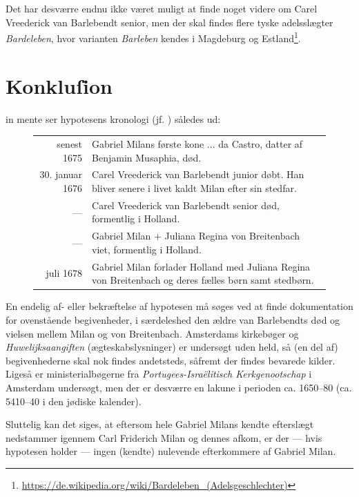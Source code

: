 \documentclass[
	a4paper,
	12pt,
	final
]{memoir}
\begin{document}
Det har desværre endnu ikke været muligt at finde noget videre om Carel Vreederick van Barlebendt senior, men der skal findes flere tyske adelsslægter \emph{Bardeleben}, hvor varianten \emph{Barleben} kendes i Magdeburg og Estland\footnote{  \url{https://de.wikipedia.org/wiki/Bardeleben_(Adelsgeschlechter)}}.

\section{Konkluſion}

 in mente ser hypotesens kronologi (jf. ) således ud:

\begin{savenotes}%
\begin{figure}[H]%
\centerfloat%
\begin{tabular}{r p{}}
	senest 1675 & Gabriel Milans første kone ... da Castro, datter af Benjamin Musaphia, død. \\
	30. januar 1676 & Carel Vreederick van Barlebendt junior døbt. Han bliver senere i livet kaldt Milan efter sin stedfar. \\
	--- & Carel Vreederick van Barlebendt senior død, formentlig i Holland. \\
	--- & Gabriel Milan + Juliana Regina von Breitenbach viet, formentlig i Holland. \\
	juli 1678 & Gabriel Milan forlader Holland med Juliana Regina von Breitenbach og deres fælles børn samt stedbørn. \\
\end{tabular}%
\end{figure}%
\end{savenotes}

En endelig af- eller bekræftelse af hypotesen må søges ved at finde dokumentation for ovenstående begivenheder, i særdeleshed den ældre van Barlebendts død og vielsen mellem Milan og von Breitenbach. Amsterdams kirkebøger og \emph{Huwelijksaangiften} (ægteskabslysninger) er undersøgt uden held, så (en del af) begivenhederne skal nok findes andetsteds, såfremt der findes bevarede kilder. Ligeså er ministerialbøgerne fra \emph{Portugees-Israëlitisch Kerkgenootschap} i Amsterdam undersøgt, men der er desværre en lakune i perioden ca. 1650--80 (ca. 5410--40 i den jødiske kalender). 

Sluttelig kan det siges, at eftersom hele Gabriel Milans kendte efterslægt nedstammer igennem Carl Friderich Milan og dennes afkom, er der --- hvis hypotesen holder --- ingen (kendte) nulevende efterkommere af Gabriel Milan.

%
\end{document}

